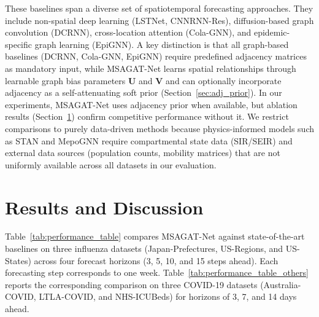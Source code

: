 \documentclass[final,1p,times]{elsarticle}
\begin{document}
These baselines span a diverse set of spatiotemporal forecasting approaches. They include non-spatial deep learning (LSTNet, CNNRNN-Res), diffusion-based graph convolution (DCRNN), cross-location attention (Cola-GNN), and epidemic-specific graph learning (EpiGNN). A key distinction is that all graph-based baselines (DCRNN, Cola-GNN, EpiGNN) require predefined adjacency matrices as mandatory input, while MSAGAT-Net learns spatial relationships through learnable graph bias parameters $\mathbf{U}$ and $\mathbf{V}$ and can optionally incorporate adjacency as a self-attenuating soft prior (Section~\ref{sec:adj_prior}). In our experiments, MSAGAT-Net uses adjacency prior when available, but ablation results (Section~\ref{sec:results}) confirm competitive performance without it. We restrict comparisons to purely data-driven methods because physics-informed models such as STAN \cite{gao2021stan} and MepoGNN \cite{cao2022mepognn} require compartmental state data (SIR/SEIR) and external data sources (population counts, mobility matrices) that are not uniformly available across all datasets in our evaluation.

\section{Results and Discussion}
\label{sec:results}

Table~\ref{tab:performance_table} compares MSAGAT-Net against state-of-the-art baselines on three influenza datasets (Japan-Prefectures, US-Regions, and US-States) across four forecast horizons (3, 5, 10, and 15 steps ahead). Each forecasting step corresponds to one week. Table~\ref{tab:performance_table_others} reports the corresponding comparison on three COVID-19 datasets (Australia-COVID, LTLA-COVID, and NHS-ICUBeds) for horizons of 3, 7, and 14 days ahead.
\end{document}

